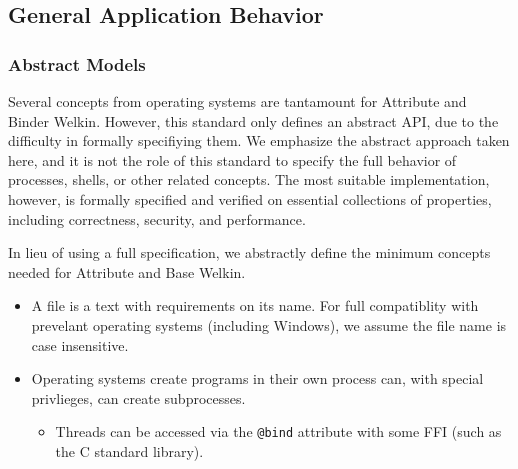 \begin{itemize}




\section{General Application Behavior}

\subsubsection*{Abstract Models}

Several concepts from operating systems are tantamount for Attribute and Binder Welkin. However, this standard only defines an abstract API, due to the difficulty in formally specifiying them. We emphasize the abstract approach taken here, and it is not the role of this standard to specify the full behavior of processes, shells, or other related concepts. The most suitable implementation, however, is formally specified and verified on essential collections of properties, including correctness, security, and performance.


In lieu of using a full specification, we abstractly define the minimum concepts needed for Attribute and Base Welkin.
\begin{itemize}
  \item A file is a text with requirements on its name. For full compatiblity with prevelant operating systems (including Windows), we assume the file name is case insensitive.
  \item Operating systems create programs in their own process can, with special privlieges, can create subprocesses.
  \begin{itemize}
  \item Threads can be accessed via the \texttt{@bind} attribute with some FFI (such as the C standard library).
  \end{itemize}
\end{itemize}


\end{itemize}

